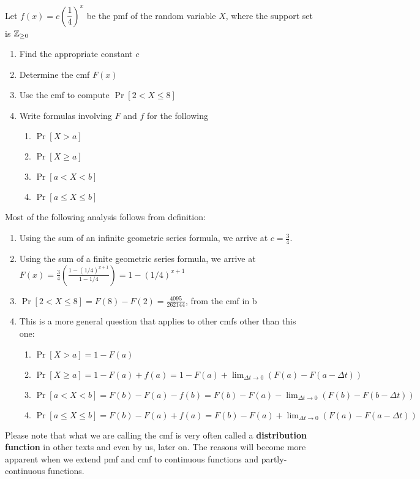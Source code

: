 \documentclass[../main.tex]{subfiles}
\begin{document}
\begin{example}
Let $f(x) = c\left(\dfrac{1}{4}\right)^x$ be the pmf of the random variable $X$, where the support set is $\mathbb{Z}_{\geq 0}$ 
\begin{enumerate}
\item Find the appropriate constant $c$
\item Determine the cmf $F(x)$
\item Use the cmf to compute $\Pr[2 < X \leq 8]$
\item Write formulas involving $F$ and $f$ for the following
    \begin{enumerate}
        \item $\Pr[X > a]$
        \item $\Pr[X \geq a]$
        \item $\Pr[a < X < b]$
        \item $\Pr[a \leq X \leq b]$
    \end{enumerate}
\end{enumerate}
\begin{solution}
Most of the following analysis follows from definition: 
\begin{enumerate}
    \item Using the sum of an infinite geometric series formula, we arrive at $c = \frac 34$. 
    \item Using the sum of a finite geometric series formula, we arrive at $F(x) = \frac{3}{4}\left(\frac{1-(1/4)^{x+1}}{1-1/4}\right) = 1-(1/4)^{x+1}$
    \item $\Pr[2 < X \leq 8] = F(8)-F(2) = \frac{4095}{262144}$, from the cmf in b
    \item This is a more general question that applies to other cmfs other than this one: 
    \begin{enumerate}
        \item $\Pr[X > a] = 1-F(a)$
        \item $\Pr[X \geq a] = 1-F(a)+f(a) = 1-F(a)+\displaystyle\lim_{\Delta t \to 0} (F(a)-F(a-\Delta t))$
        \item $\Pr[a < X < b] = F(b)-F(a)-f(b) = F(b)-F(a)-\displaystyle\lim_{\Delta t \to 0} (F(b)-F(b-\Delta t))$
        \item $\Pr[a \leq X \leq b] = F(b)-F(a)+f(a)=F(b)-F(a)+\displaystyle\lim_{\Delta t \to 0} (F(a)-F(a-\Delta t))$
    \end{enumerate}

\end{enumerate}
\end{solution}
\begin{remark}
Please note that what we are calling the cmf is very often called a \textbf{distribution function} in other texts and even by us, later on. The reasons will become more apparent when we extend pmf and cmf to continuous functions and partly-continuous functions.
\end{remark}
\end{example}
\end{document}
